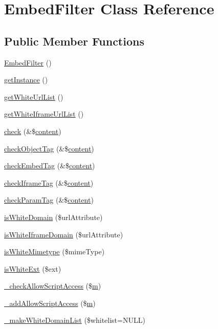 \hypertarget{classEmbedFilter}{}\section{Embed\+Filter Class Reference}
\label{classEmbedFilter}
\subsection*{Public Member Functions}
\begin{DoxyCompactItemize}
\item 
\hyperlink{classEmbedFilter_a62571fb9caf83a1ce168e20887709309}{Embed\+Filter} ()
\item 
\hyperlink{classEmbedFilter_af8a43e4bc0161225381536c133792463}{get\+Instance} ()
\item 
\hyperlink{classEmbedFilter_a7e931adc623954f9a372b4ea4976f44f}{get\+White\+Url\+List} ()
\item 
\hyperlink{classEmbedFilter_ab67db1799d818d46e47006592b4e7695}{get\+White\+Iframe\+Url\+List} ()
\item 
\hyperlink{classEmbedFilter_ae494226c2201ff0c6c4c85ba429a16cf}{check} (\&\$\hyperlink{classcontent}{content})
\item 
\hyperlink{classEmbedFilter_a3c703c014813fb916c72d95e964a3e0d}{check\+Object\+Tag} (\&\$\hyperlink{classcontent}{content})
\item 
\hyperlink{classEmbedFilter_a6b0bba8c1ef91ae9afe7f26675216cb3}{check\+Embed\+Tag} (\&\$\hyperlink{classcontent}{content})
\item 
\hyperlink{classEmbedFilter_a1026957e48eed307ee66c506f54a1847}{check\+Iframe\+Tag} (\&\$\hyperlink{classcontent}{content})
\item 
\hyperlink{classEmbedFilter_ac0bed1ed95e5b5afb465051ad77d4569}{check\+Param\+Tag} (\&\$\hyperlink{classcontent}{content})
\item 
\hyperlink{classEmbedFilter_a12fcd3bdd961d247598d003b537b5e7f}{is\+White\+Domain} (\$url\+Attribute)
\item 
\hyperlink{classEmbedFilter_ada5403255f1d3612afefdc6d35e03d7f}{is\+White\+Iframe\+Domain} (\$url\+Attribute)
\item 
\hyperlink{classEmbedFilter_a34e7259c822a6c346a218bea0976e1cd}{is\+White\+Mimetype} (\$mime\+Type)
\item 
\hyperlink{classEmbedFilter_ae3cc90883fe1fd15c692ab8268ae15b3}{is\+White\+Ext} (\$ext)
\item 
\hyperlink{classEmbedFilter_a75054db2fbd30ab9392bbccf8dec3885}{\+\_\+check\+Allow\+Script\+Access} (\$\hyperlink{jqplot_8barRenderer_8min_8js_a10e752a52784980deba83e0ae1cb7cf1}{m})
\item 
\hyperlink{classEmbedFilter_aac65b76958724ca9ae13ea3d4b6da84b}{\+\_\+add\+Allow\+Script\+Access} (\$\hyperlink{jqplot_8barRenderer_8min_8js_a10e752a52784980deba83e0ae1cb7cf1}{m})
\item 
\hyperlink{classEmbedFilter_a9957ded7133614407948d1b2bc43a771}{\+\_\+make\+White\+Domain\+List} (\$whitelist=N\+U\+LL)
\end{DoxyCompactItemize}
